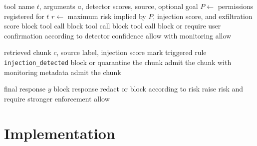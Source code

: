 \documentclass[11pt]{article}
\begin{document}
\begin{algorithm}[H]
\caption{Risk-adaptive tool-call decision}
\begin{algorithmic}[1]
\Require tool name $t$, arguments $a$, detector scores, source, optional goal
\State $P \gets$ permissions registered for $t$
\State $r \gets$ maximum risk implied by $P$, injection score, and exfiltration score
  \State \Return block tool call
\EndIf
{}
  \State \Return block tool call
\EndIf
{}
  \State \Return block tool call
\EndIf
{}
  \State \Return block or require user confirmation according to detector confidence
\EndIf
{}
  \State \Return allow with monitoring
\EndIf
\State \Return allow
\end{algorithmic}
\end{algorithm}

\begin{algorithm}[H]
\caption{Retrieval-context screening}
\begin{algorithmic}[1]
\Require retrieved chunk $c$, source label, injection score
  \State mark triggered rule \texttt{injection\_detected}
\EndIf
{}
  \State block or quarantine the chunk
  \State admit the chunk with monitoring metadata
\Else
  \State admit the chunk
\EndIf
\end{algorithmic}
\end{algorithm}

\begin{algorithm}[H]
\caption{Output exfiltration control}
\begin{algorithmic}[1]
\Require final response $y$
  \State \Return block response
\EndIf
{}
  \State redact or block according to risk
\EndIf
{}
  \State raise risk and require stronger enforcement
\EndIf
\State \Return allow
\end{algorithmic}
\end{algorithm}

\section{Implementation}
\end{document}
